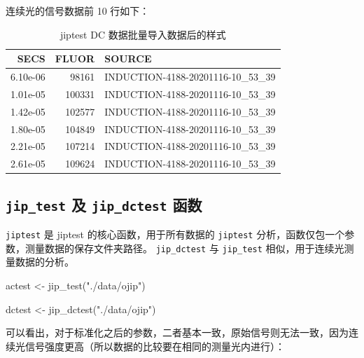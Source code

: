 \documentclass[
]{krantz}
\makeatletter
\newenvironment{Shaded}{\begin{snugshade}}{\end{snugshade}}
\newcommand{\FunctionTok}[1]{\textcolor[rgb]{0.00,0.00,0.00}{#1}}
\newcommand{\NormalTok}[1]{#1}
\newcommand{\OtherTok}[1]{\textcolor[rgb]{0.56,0.35,0.01}{#1}}
\newcommand{\StringTok}[1]{\textcolor[rgb]{0.31,0.60,0.02}{#1}}
\newenvironment{kframe}{%
\medskip{}
\setlength{\fboxsep}{.8em}
 \def\at@end@of@kframe{}%
 \ifinner\ifhmode%
  \def\at@end@of@kframe{\end{minipage}}%
  \begin{minipage}{\columnwidth}%
 \fi\fi%
 \def\FrameCommand##1{\hskip\@totalleftmargin \hskip-\fboxsep
 \colorbox{shadecolor}{##1}\hskip-\fboxsep
     \hskip-\linewidth \hskip-\@totalleftmargin \hskip\columnwidth}%
 \MakeFramed {\advance\hsize-\width
   \@totalleftmargin\z@ \linewidth\hsize
   \@setminipage}}%
 {\par\unskip\endMakeFramed%
 \at@end@of@kframe}
\renewenvironment{Shaded}{\begin{kframe}}{\end{kframe}}
\makeatother
\begin{document}
连续光的信号数据前 10 行如下：

\begin{table}

\caption{\label{tab:unnamed-chunk-68}jiptest DC 数据批量导入数据后的样式}
\centering
\begin{tabular}[t]{rrl}
\toprule
SECS & FLUOR & SOURCE\\
\midrule
6.10e-06 & 98161 & INDUCTION-4188-20201116-10\_53\_39\\
1.01e-05 & 100331 & INDUCTION-4188-20201116-10\_53\_39\\
1.42e-05 & 102577 & INDUCTION-4188-20201116-10\_53\_39\\
1.80e-05 & 104849 & INDUCTION-4188-20201116-10\_53\_39\\
2.21e-05 & 107214 & INDUCTION-4188-20201116-10\_53\_39\\
\addlinespace
2.61e-05 & 109624 & INDUCTION-4188-20201116-10\_53\_39\\
\bottomrule
\end{tabular}
\end{table}

\hypertarget{testfluor}{%
\subsection{\texorpdfstring{\texttt{jip\_test} 及 \texttt{jip\_dctest} 函数}{jip\_test 及 jip\_dctest 函数}}\label{testfluor}}

\texttt{jiptest} 是 jiptest 的核心函数，用于所有数据的 \texttt{jiptest} 分析，函数仅包一个参数，测量数据的保存文件夹路径。
\texttt{jip\_dctest} 与 \texttt{jip\_test} 相似，用于连续光测量数据的分析。

\begin{Shaded}
\begin{Highlighting}[]
\NormalTok{actest }\OtherTok{\textless{}{-}} \FunctionTok{jip\_test}\NormalTok{(}\StringTok{"./data/ojip"}\NormalTok{)}
\end{Highlighting}
\end{Shaded}

\begin{Shaded}
\begin{Highlighting}[]
\NormalTok{dctest }\OtherTok{\textless{}{-}} \FunctionTok{jip\_dctest}\NormalTok{(}\StringTok{"./data/ojip"}\NormalTok{)}
\end{Highlighting}
\end{Shaded}

可以看出，对于标准化之后的参数，二者基本一致，原始信号则无法一致，因为连续光信号强度更高（所以数据的比较要在相同的测量光内进行）：
\end{document}
